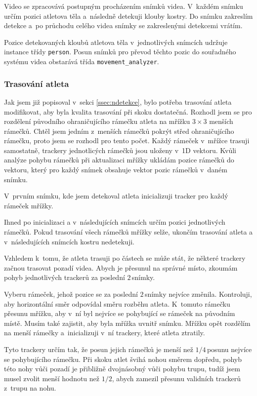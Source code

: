 Video se zpracovává postupným procházením snímků videa. V~každém snímku určím pozici atletova těla a~následně detekuji klouby kostry. Do snímku zakreslím detekce a~po průchodu celého videa snímky se zakreslenými detekcemi vrátím.

Pozice detekovaných kloubů atletova těla v~jednotlivých snímcích udržuje instance třídy \texttt{person}. Posun snímků pro převod těchto pozic do souřadného systému videa obstarává třída \texttt{movement\_analyzer}.


\subsubsection{Trasování atleta}

Jak jsem již popisoval v~sekci \ref{ssec:ndetekce}, bylo potřeba trasování atleta modifikovat, aby byla kvalita trasování při skoku dostatečná. Rozhodl jsem se pro rozdělení původního ohraničujícího rámečku atleta na mřížku $3\times 3$ menších rámečků. Chtěl jsem jedním z~menších rámečků pokrýt střed ohraničujícího rámečku, proto jsem se rozhodl pro tento počet. Každý rámeček v~mřížce trasuji samostatně, trackery jednotlicých rámečků jsou uloženy v~1D vektoru. Kvůli analýze pohybu rámečků při aktualizaci mřížky ukládám pozice rámečků do vektoru, který pro každý snímek obsahuje vektor pozic rámečků v~daném snímku.

V~prvním snímku, kde jsem detekoval atleta inicializuji tracker pro každý rámeček mřížky.

Ihned po inicializaci a v~následujících snímcích určím pozici jednotlivých rámečků. Pokud trasování všech rámečků mřížky selže, ukončím trasování atleta a v~následujících snímcích kostru nedetekuji.

Vzhledem k~tomu, že atleta trasuji po částech se může stát, že některé trackery začnou trasovat pozadí videa. Abych je přesunul na správné místo, zkoumám pohyb jednotlivých trackerů za poslední $2$\,\rm snímky.

Vyberu rámeček, jehož pozice se za poslední $2$\,\rm snímky nejvíce změnila. Kontroluji, aby horizontální směr odpovídal směru rozběhu atleta. K~tomuto rámečku přesunu mřížku, aby v~ní byl nejvíce se pohybující se rámeček na původním místě. Musím také zajistit, aby byla mřížka uvnitř snímku. Mřížku opět rozdělím na menší rámečky a~inicializuji v~ní trackery, které atleta ztratily.

Tyto trackery určím tak, že posun jejich rámečků je menší než $1/4$\,\rm posunu nejvíce se pohybujícího rámečku. Při skoku atlet švihá nohou směrem dopředu, pohyb této nohy vůči pozadí je přibližně dvojnásobný vůči pohybu trupu, tudíž jsem musel zvolit menší hodnotu než $1/2$, abych zamezil přesunu validních trackerů z~trupu na nohu.

